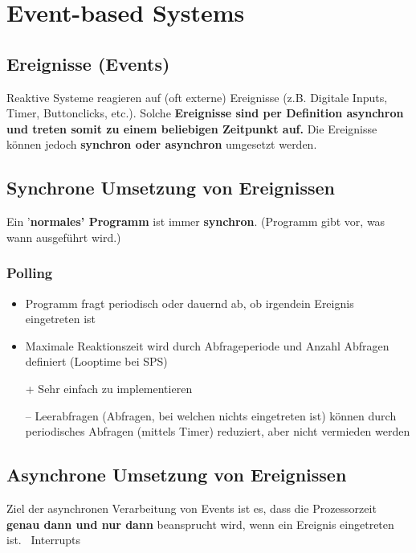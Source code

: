 \section{Event-based Systems}

\subsection{Ereignisse (Events)}

Reaktive Systeme reagieren auf (oft externe) Ereignisse (z.B. Digitale Inputs, Timer, Buttonclicks, etc.). Solche \textbf{Ereignisse sind per 
Definition asynchron und treten somit zu einem beliebigen Zeitpunkt auf.} 
Die Ereignisse können jedoch \textbf{synchron oder asynchron} umgesetzt werden.


\subsection{Synchrone Umsetzung von Ereignissen}

Ein '\textbf{normales' Programm} ist immer \textbf{synchron}. (Programm gibt vor, was wann ausgeführt wird.)

\subsubsection{Polling}

\begin{itemize}
    \item Programm fragt periodisch oder dauernd ab, ob irgendein Ereignis eingetreten ist
    \item Maximale Reaktionszeit wird durch Abfrageperiode und Anzahl Abfragen definiert (Looptime bei SPS)
    \item[+] Sehr einfach zu implementieren
    \item[--] Leerabfragen (Abfragen, bei welchen nichts eingetreten ist) können durch periodisches Abfragen (mittels Timer) reduziert, 
        aber nicht vermieden werden
\end{itemize}


\subsection{Asynchrone Umsetzung von Ereignissen}

Ziel der asynchronen Verarbeitung von Events ist es, dass die Prozessorzeit \textbf{genau dann und nur dann} beansprucht wird, wenn ein 
Ereignis eingetreten ist. \textrightarrow\ Interrupts


